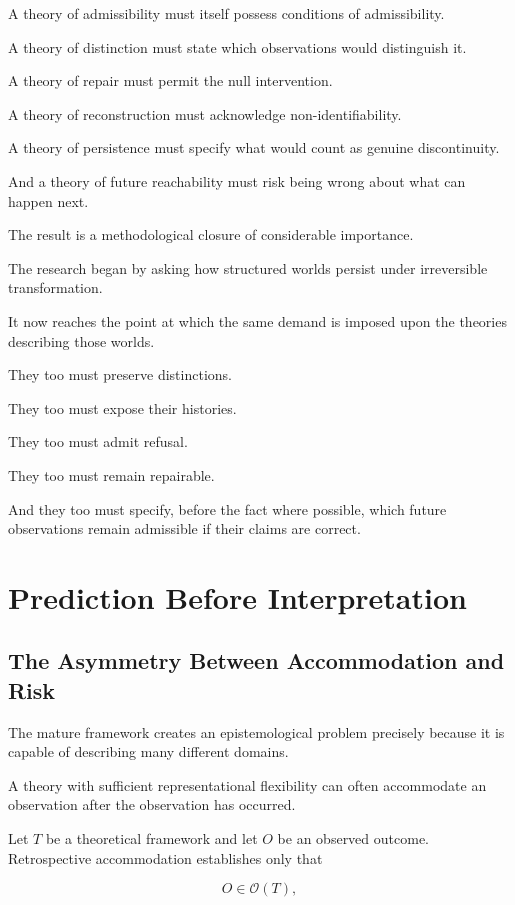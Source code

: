 \documentclass[11pt]{article}
\theoremstyle{remark}
\begin{document}
A theory of admissibility must itself possess conditions of admissibility.

A theory of distinction must state which observations would distinguish it.

A theory of repair must permit the null intervention.

A theory of reconstruction must acknowledge non-identifiability.

A theory of persistence must specify what would count as genuine discontinuity.

And a theory of future reachability must risk being wrong about what can happen next.

The result is a methodological closure of considerable importance.

The research began by asking how structured worlds persist under irreversible transformation.

It now reaches the point at which the same demand is imposed upon the theories describing those worlds.

They too must preserve distinctions.

They too must expose their histories.

They too must admit refusal.

They too must remain repairable.

And they too must specify, before the fact where possible, which future observations remain admissible if their claims are correct.

\section{Prediction Before Interpretation}

\subsection{The Asymmetry Between Accommodation and Risk}

The mature framework creates an epistemological problem precisely because it is capable of describing many different domains.

A theory with sufficient representational flexibility can often accommodate an observation after the observation has occurred.

Let $T$ be a theoretical framework and let $O$ be an observed outcome. Retrospective accommodation establishes only that

\begin{equation}
O\in\mathcal{O}(T),
\end{equation}
\end{document}

